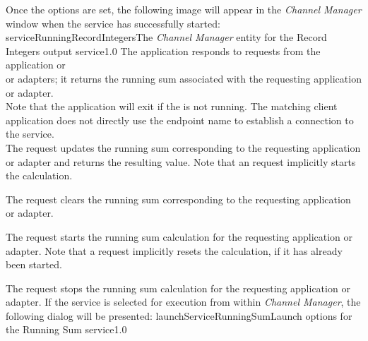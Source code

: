 Once the options are set, the following image will appear in the \emph{Channel Manager}
window when the service has successfully started:
%
{serviceRunningRecordIntegers}{The \emph{Channel Manager} entity for the Record Integers
output service}{1.0}
\condPage
{}
The  application responds to
requests from the  application or\\
 or
 adapters; it returns the running sum
associated with the requesting application or adapter.\\

Note that the application will exit if the
 is not running.
\insertAutoAppParameters
{}
The matching client application does not directly use the endpoint name to establish a
connection to the service.\\

The  request updates the running sum
corresponding to the requesting application or adapter and returns the resulting value.
Note that an  request implicitly starts the
calculation.\\
%

The  request clears the running sum
corresponding to the requesting application or adapter.\\
%

The  request starts the running sum
calculation for the requesting application or adapter.
Note that a  request implicitly resets the
calculation, if it has already been started.\\
%

The  request stops the running sum
calculation for the requesting application or adapter.
%
\condPage
If the service is selected for execution from within \emph{Channel Manager}, the following
dialog will be presented:
%
{launchServiceRunningSum}{Launch options for the Running Sum service}{1.0}

